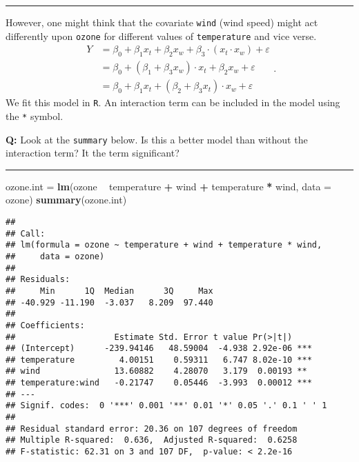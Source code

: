 \documentclass[]{article}
\newenvironment{Shaded}{\begin{snugshade}}{\end{snugshade}}
\newcommand{\DataTypeTok}[1]{\textcolor[rgb]{0.13,0.29,0.53}{#1}}
\newcommand{\KeywordTok}[1]{\textcolor[rgb]{0.13,0.29,0.53}{\textbf{#1}}}
\newcommand{\NormalTok}[1]{#1}
\newcommand{\OperatorTok}[1]{\textcolor[rgb]{0.81,0.36,0.00}{\textbf{#1}}}
\newcommand{\StringTok}[1]{\textcolor[rgb]{0.31,0.60,0.02}{#1}}
\begin{document}
\begin{center}\rule{0.5\linewidth}{\linethickness}\end{center}

However, one might think that the covariate \texttt{wind} (wind speed)
might act differently upon \texttt{ozone} for different values of
\texttt{temperature} and vice verse.
\[\begin{aligned} Y &= \beta_0 +  \beta_1 x_t + \beta_2 x_w + \beta_3\cdot(x_t  \cdot x_w) +\varepsilon \\ &= \beta_0 +  (\beta_1 + \beta_3 x_w) \cdot x_t + \beta_2 x_w + \varepsilon \\ &= \beta_0 + \beta_1 x_t + (\beta_2 + \beta_3 x_t) \cdot x_w + \varepsilon \end{aligned}.\]
We fit this model in \texttt{R}. An interaction term can be included in
the model using the \texttt{*} symbol.

\textbf{Q:} Look at the \texttt{summary} below. Is this a better model
than without the interaction term? It the term significant?

\begin{center}\rule{0.5\linewidth}{\linethickness}\end{center}

\footnotesize

\begin{Shaded}
\begin{Highlighting}[]
\NormalTok{ozone.int =}\StringTok{ }\KeywordTok{lm}\NormalTok{(ozone }\OperatorTok{~}\StringTok{ }\NormalTok{temperature }\OperatorTok{+}\StringTok{ }\NormalTok{wind }\OperatorTok{+}\StringTok{ }\NormalTok{temperature }\OperatorTok{*}\StringTok{ }\NormalTok{wind, }\DataTypeTok{data =}\NormalTok{ ozone)}
\KeywordTok{summary}\NormalTok{(ozone.int)}
\end{Highlighting}
\end{Shaded}

\begin{verbatim}
## 
## Call:
## lm(formula = ozone ~ temperature + wind + temperature * wind, 
##     data = ozone)
## 
## Residuals:
##     Min      1Q  Median      3Q     Max 
## -40.929 -11.190  -3.037   8.209  97.440 
## 
## Coefficients:
##                    Estimate Std. Error t value Pr(>|t|)    
## (Intercept)      -239.94146   48.59004  -4.938 2.92e-06 ***
## temperature         4.00151    0.59311   6.747 8.02e-10 ***
## wind               13.60882    4.28070   3.179  0.00193 ** 
## temperature:wind   -0.21747    0.05446  -3.993  0.00012 ***
## ---
## Signif. codes:  0 '***' 0.001 '**' 0.01 '*' 0.05 '.' 0.1 ' ' 1
## 
## Residual standard error: 20.36 on 107 degrees of freedom
## Multiple R-squared:  0.636,  Adjusted R-squared:  0.6258 
## F-statistic: 62.31 on 3 and 107 DF,  p-value: < 2.2e-16
\end{verbatim}
\end{document}
